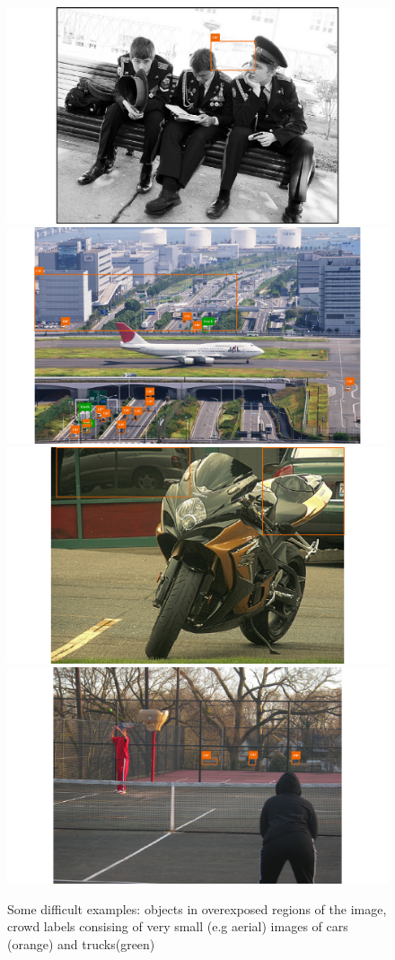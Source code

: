 \begin{figure}[h]
    \captionsetup{width=\textwidth}
    \caption{Some difficult examples: objects in overexposed regions of the image, crowd labels consising of very small (e.g aerial) images of cars (orange) and trucks(green)}
    \includegraphics[width=.49\textwidth]{figures/car-overexposed.png}
    \includegraphics[width=.49\textwidth]{figures/car-truck-small-crowd.png}\\
    \includegraphics[width=.49\textwidth]{figures/car-reflection-partial.png}\includegraphics[width=.49\textwidth]{figures/car-obscure.png}\\
\end{figure}






